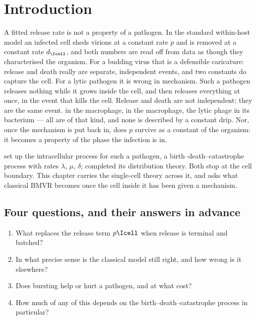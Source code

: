 
\section{Introduction}
\label{p:sec:introduction}

A fitted release rate is not a property of a pathogen. In the standard
within-host model an infected cell sheds virions at a constant rate $p$ and
is removed at a constant rate $d_{\Icell}$, and both numbers are read off
from data as though they characterised the organism. For a budding virus
that is a defensible caricature: release and death really are separate,
independent events, and two constants do capture the cell. For a
lytic pathogen it is wrong in mechanism. Such a pathogen releases nothing
while it grows inside the cell, and then releases everything at once, in the
event that kills the cell. Release and death are not independent; they are
the same event. \yp{} in the macrophage, \ft{} in the macrophage, the lytic
phage in its bacterium --- all are of that kind, and none is described by a
constant drip. Nor, once the mechanism is put back in, does $p$ survive as a
constant of the organism: it becomes a property of the phase the infection
is in.

\ChCorecap{} set up the intracellular process for such a pathogen, a
birth--death--catastrophe process with rates $\lambda$, $\mu$, $\delta$;
\ChDist{} completed its distribution theory. Both stop at the cell boundary.
This chapter carries the single-cell theory across it, and asks what
classical BMVR becomes once the cell inside it has been given
a mechanism.

\subsection{Four questions, and their answers in advance}

\begin{enumerate}
\item What replaces the release term $p\Icell$ when release is terminal and
batched?
\item In what precise sense is the classical model still right, and how
wrong is it elsewhere?
\item Does bursting help or hurt a pathogen, and at what cost?
\item How much of any of this depends on the birth--death--catastrophe
process in particular?
\end{enumerate}


